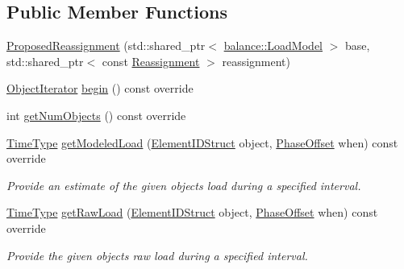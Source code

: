 \subsection*{Public Member Functions}
\begin{DoxyCompactItemize}
\item 
\hyperlink{structvt_1_1vrt_1_1collection_1_1balance_1_1_proposed_reassignment_a8c678464bec1fa46e24c69be66a45220}{Proposed\+Reassignment} (std\+::shared\+\_\+ptr$<$ \hyperlink{structvt_1_1vrt_1_1collection_1_1balance_1_1_load_model}{balance\+::\+Load\+Model} $>$ base, std\+::shared\+\_\+ptr$<$ const \hyperlink{structvt_1_1vrt_1_1collection_1_1balance_1_1_reassignment}{Reassignment} $>$ reassignment)
\item 
\hyperlink{structvt_1_1vrt_1_1collection_1_1balance_1_1_object_iterator}{Object\+Iterator} \hyperlink{structvt_1_1vrt_1_1collection_1_1balance_1_1_proposed_reassignment_ad7a65c6be802368df458f6005ef69d23}{begin} () const override
\item 
int \hyperlink{structvt_1_1vrt_1_1collection_1_1balance_1_1_proposed_reassignment_a7134943ece9dc9a0d4539536f60eed6e}{get\+Num\+Objects} () const override
\item 
\hyperlink{namespacevt_a876a9d0cd5a952859c72de8a46881442}{Time\+Type} \hyperlink{structvt_1_1vrt_1_1collection_1_1balance_1_1_proposed_reassignment_aca9fab69b816133d56dfa88418e0e54f}{get\+Modeled\+Load} (\hyperlink{namespacevt_1_1vrt_1_1collection_1_1balance_a9f5b53fafb270212279a4757d2c4cd28}{Element\+I\+D\+Struct} object, \hyperlink{structvt_1_1vrt_1_1collection_1_1balance_1_1_phase_offset}{Phase\+Offset} when) const override
\begin{DoxyCompactList}\small\item\em Provide an estimate of the given object\textquotesingle{}s load during a specified interval. \end{DoxyCompactList}\item 
\hyperlink{namespacevt_a876a9d0cd5a952859c72de8a46881442}{Time\+Type} \hyperlink{structvt_1_1vrt_1_1collection_1_1balance_1_1_proposed_reassignment_a2259e174dcc5b6664e95e653ea8f5a31}{get\+Raw\+Load} (\hyperlink{namespacevt_1_1vrt_1_1collection_1_1balance_a9f5b53fafb270212279a4757d2c4cd28}{Element\+I\+D\+Struct} object, \hyperlink{structvt_1_1vrt_1_1collection_1_1balance_1_1_phase_offset}{Phase\+Offset} when) const override
\begin{DoxyCompactList}\small\item\em Provide the given object\textquotesingle{}s raw load during a specified interval. \end{DoxyCompactList}\end{DoxyCompactItemize}
